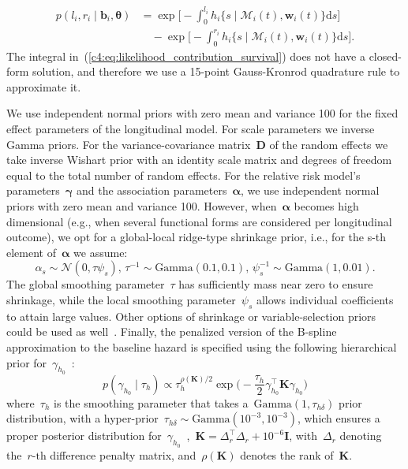 \begin{subappendices}
\begin{equation}
\begin{split}
\label{c4:eq:likelihood_contribution_survival}
p(l_i,r_i\mid \boldsymbol{b}_i,\boldsymbol{\theta}) &= \exp\Big[-\int_0^{l_i} h_i\big\{s \mid \mathcal{M}_i(t), \boldsymbol{w}_i(t)\big\}\mathrm{d}{s}\Big]\\ & \quad - \exp\Big[-\int_0^{r_i}h_i\big\{s \mid \mathcal{M}_i(t), \boldsymbol{w}_i(t)\big\}\mathrm{d}{s}\Big].
\end{split}
\end{equation}
The integral in~(\ref{c4:eq:likelihood_contribution_survival}) does not have a closed-form solution, and therefore we use a 15-point Gauss-Kronrod quadrature rule to approximate it.

We use independent normal priors with zero mean and variance 100 for the fixed effect parameters of the longitudinal model. For scale parameters we inverse Gamma priors. For the variance-covariance matrix~$\boldsymbol{D}$ of the random effects we take inverse Wishart prior with an identity scale matrix and degrees of freedom equal to the total number of random effects. For the relative risk model's parameters~$\boldsymbol{\gamma}$ and the association parameters~$\boldsymbol{\alpha}$, we use independent normal priors with zero mean and variance 100. However, when~$\boldsymbol{\alpha}$ becomes high dimensional (e.g., when several functional forms are considered per longitudinal outcome), we opt for a global-local ridge-type shrinkage prior, i.e., for the s-th element of~$\boldsymbol{\alpha}$ we assume:
\begin{equation}
\alpha_s \sim \mathcal{N}(0, \tau \psi_s),\, \tau^{-1} \sim \mbox{Gamma} (0.1,0.1), \, \psi_s^{-1} \sim \mbox{Gamma}(1, 0.01).
\end{equation}
The global smoothing parameter~$\tau$ has sufficiently mass near zero to ensure shrinkage, while the local smoothing parameter~$\psi_s$ allows individual coefficients to attain large values. Other options of shrinkage or variable-selection priors could be used as well~\citep{andrinopoulou2016bayesian}. Finally, the penalized version of the B-spline approximation to the
baseline hazard is specified using the following hierarchical prior for~$\gamma_{h_0}$~\citep{lang2004bayesian}:
\begin{equation}
p(\gamma_{h_0} \mid \tau_h) \propto \tau_h^{\rho(\boldsymbol{K})/2} \exp\Big(-\frac{\tau_h}{2}\gamma_{h_0}^{\top}\boldsymbol{K}\gamma_{h_0}\Big)
\end{equation}
where~$\tau_h$ is the smoothing parameter that takes a~$\mbox{Gamma}(1, \tau_{h\delta})$ prior distribution, with a hyper-prior~$\tau_{h\delta} \sim \mbox{Gamma}(10^{-3}, 10^{-3})$, which ensures a proper posterior distribution for~$\gamma_{h_0}$~\citep{jullion2007robust},~$\boldsymbol{K} = \Delta_r^{\top} \Delta_r + 10^{-6} \boldsymbol{I}$, with~$\Delta_r$ denoting the~${r\mbox{-th}}$ difference penalty matrix, and~$\rho(\boldsymbol{K})$ denotes the rank of~$\boldsymbol{K}$.


\end{subappendices}
